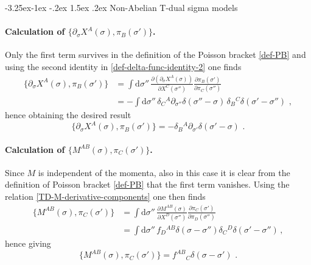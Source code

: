 \documentclass[12pt]{article}
\makeatletter
\renewcommand\subsection{\@startsection{subsection}{2}{\z@}%
                                     {-3.25ex\@plus -1ex \@minus -.2ex}%
                                     {1.5ex \@plus .2ex}%
                                     {\normalfont\bfseries}}
\numberwithin{equation}{section}
\makeatother
\begin{document}
\subsection{Non-Abelian T-dual sigma models}\label{appendix:C-TD}
\paragraph{Calculation of $\{ \partial_{\sigma}X^{A}(\sigma),\pi_{B}(\sigma') \}$.} Only the first term survives in the definition of the Poisson bracket \eqref{def-PB} and using the second identity in \eqref{def-delta-func-identity-2} one finds
\begin{equation}
\begin{aligned}
\{ \partial_{\sigma}X^{A}(\sigma),\pi_{B}(\sigma') \}&=\int \mathrm{d}\sigma'' \, \frac{\partial(\partial_{\sigma}X^{A}(\sigma))}{\partial X^{C}(\sigma'')}\frac{\partial \pi_{B}(\sigma')}{\partial\pi_{C}(\sigma'')}
\\
&= -\int \mathrm{d}\sigma'' \, \delta_{C}{}^{A}\partial_{\sigma''}\delta(\sigma''-\sigma) \, \delta_{B}{}^{C}\delta(\sigma'-\sigma'') \,\, ,
\end{aligned}
\end{equation}
hence obtaining the desired result
\begin{equation}\label{TD-partialX-pi-bracket}
\{ \partial_{\sigma}X^{A}(\sigma),\pi_{B}(\sigma') \}=-\delta_{B}{}^{A}\partial_{\sigma'}\delta(\sigma'-\sigma) \,\, .
\end{equation}

\paragraph{Calculation of $\{ M^{AB}(\sigma),\pi_{C}(\sigma') \}$.} Since $M$ is independent of the momenta, also in this case it is clear from the definition of Poisson bracket \eqref{def-PB} that the first term vanishes. Using the relation \eqref{TD-M-derivative-components} one then finds
\begin{equation}
\begin{aligned}
\{ M^{AB}(\sigma),\pi_{C}(\sigma') \}&=\int \mathrm{d}\sigma'' \, \frac{\partial M^{AB}(\sigma)}{\partial X^{D}(\sigma'')}\frac{\partial \pi_{C}(\sigma')
}{\partial\pi_{D}(\sigma'')}
\\
&=\int \mathrm{d}\sigma'' \, f_{D}{}^{AB}\delta(\sigma-\sigma'')\delta_{C}{}^{D}\delta(\sigma'-\sigma'') \, ,
\end{aligned}
\end{equation}
hence giving
\begin{equation}\label{TD-M-pi-bracket}
\{ M^{AB}(\sigma),\pi_{C}(\sigma') \}=f^{AB}{}_{C}\delta(\sigma-\sigma') \,\, .
\end{equation}
\end{document}
